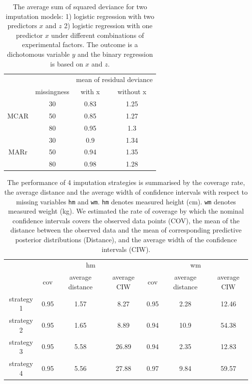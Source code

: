 \documentclass[12pt, fullpage, a4paper]{article}
\begin{document}
\begin{table}[ht!]
	\begin{tabular}{cc|cc}
		&             & \multicolumn{2}{c}{mean of residual deviance} \\ \cline{2-4} 
		\multicolumn{1}{c|}{}     & missingness & with x               & without x               \\
		\multicolumn{1}{c|}{}     & 30          & 0.83                 & 1.25                    \\
		\multicolumn{1}{c|}{MCAR} & 50          & 0.85                 & 1.27                    \\
		\multicolumn{1}{c|}{}     & 80          & 0.95                 & 1.3                     \\ \hline
		\multicolumn{1}{c|}{}     & 30          & 0.9                  & 1.34                    \\
		\multicolumn{1}{c|}{MARr} & 50          & 0.94                 & 1.35                    \\
		\multicolumn{1}{c|}{}     & 80          & 0.98                 & 1.28                   
	\end{tabular}
	\caption{The average sum of squared deviance for two imputation models: 1) logistic regression with two predictors $x$ and $z$ 2) logistic regression with one predictor $x$ under different combinations of experimental factors. The outcome is a dichotomous variable $y$ and the binary regression is based on $x$ and $z$.}
	\label{tab6_5}
\end{table}

\begin{table}[ht!]
	\begin{tabular}{c|ccc|ccc}
		& \multicolumn{3}{c|}{hm}               & \multicolumn{3}{c}{wm}                \\ \cline{2-7} 
		& cov  & average distance & average CIW & cov  & average distance & average CIW \\
		strategy 1 & 0.95 & 1.57             & 8.27        & 0.95 & 2.28             & 12.46       \\
		strategy 2 & 0.95 & 1.65             & 8.89        & 0.94 & 10.9             & 54.38       \\
		strategy 3 & 0.95 & 5.58             & 26.89       & 0.94 & 2.35             & 12.83       \\
		strategy 4 & 0.95 & 5.56             & 27.88       & 0.97 & 9.84             & 59.57      
	\end{tabular}
	\caption{The performance of 4 imputation strategies is summarised by the coverage rate, the average distance and the average width of confidence intervals with respect to missing variables \texttt{hm} and \texttt{wm}. \texttt{hm} denotes measured height (cm). \texttt{wm} denotes measured weight (kg). We estimated the rate of coverage by which the nominal confidence intervals covers the observed data points (COV), the mean of the distance between the observed data and the mean of corresponding predictive posterior distributions (Distance), and the average width of the confidence intervals (CIW).}
	\label{tab6_6}
\end{table}
\end{document}
